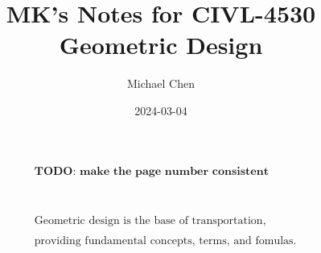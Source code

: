 \documentclass{article}
\title{MK's Notes for CIVL-4530 Geometric Design}
\date{2024-03-04}
\author{Michael Chen}
\begin{document}
  \maketitle

  \begin{align*}
  & \textbf{TODO: make the page number consistent}
  \\
  \\
  \\
  \\
  \\
  \\
  \\
  \\
  & \text{Geometric design is the base of transportation,}\\ 
  \\
  & \text{providing fundamental concepts, terms, and fomulas.}\\
  \end{align*}
  \newpage

  \tableofcontents
  \newpage


  
  \newpage
  
  \newpage
  
  \newpage
  
  \newpage



\end{document}
